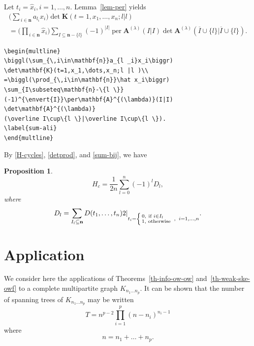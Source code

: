\documentclass{article}
\newtheorem{prop}[thm]{Proposition}
\theoremstyle{definition}
\theoremstyle{remark}
\DeclareMathOperator{\per}{per}
\newcommand{\eval}[2][\right]{\relax
  \ifx#1\right\relax \left.\fi#2#1\rvert}
\newcommand{\envert}[1]{\left\lvert#1\right\rvert}
\begin{document}
Let $t_i=\hat x_i,i=1,\dots,n$. Lemma~\ref{lem-per} yields
\begin{multline}
\biggl(\sum_{\,i\in\mathbf{n}}a_{l _i}x_i\biggr)
\det\mathbf{K}(t=1,x_1,\dots,x_n;l |l )\\
=\biggl(\prod_{\,i\in\mathbf{n}}\hat x_i\biggr)
\sum_{I\subseteq\mathbf{n}-\{l \}}
(-1)^{\envert{I}}\per\mathbf{A}^{(\lambda)}(I|I)
\det\mathbf{A}^{(\lambda)}
(\overline I\cup\{l \}|\overline I\cup\{l \}).
\label{sum-ali}
\end{multline}
\begin{verbatim}
\begin{multline}
\biggl(\sum_{\,i\in\mathbf{n}}a_{l _i}x_i\biggr)
\det\mathbf{K}(t=1,x_1,\dots,x_n;l |l )\\
=\biggl(\prod_{\,i\in\mathbf{n}}\hat x_i\biggr)
\sum_{I\subseteq\mathbf{n}-\{l \}}
(-1)^{\envert{I}}\per\mathbf{A}^{(\lambda)}(I|I)
\det\mathbf{A}^{(\lambda)}
(\overline I\cup\{l \}|\overline I\cup\{l \}).
\label{sum-ali}
\end{multline}
\end{verbatim}

By \eqref{H-cycles}, \eqref{detprod}, and \eqref{sum-bij}, we have
\begin{prop}\label{prop:eg}
\begin{equation}
H_c=\frac1{2n}\sum^n_{l =0}(-1)^{l}
D_{l},
\end{equation}
where
\begin{equation}\label{delta-l}
D_{l}=\eval[2]{\sum_{I_{l}\subseteq \mathbf{n}}
D(t_1,\dots,t_n)}_{t_i=
\left\{\begin{smallmatrix}
0,& \text{if }i\in I_{l}\quad\\%
1,& \text{otherwise}\end{smallmatrix}\right.
\;,\;\; i=1,\dots,n}.
\end{equation}
\end{prop}

\section{Application}
\label{lincomp}

We consider here the applications of Theorems~\ref{th-info-ow-ow}
and~\ref{th-weak-ske-owf} to a complete
multipartite graph $K_{n_1\dots n_p}$. It can be shown that the
number of spanning trees of $K_{n_1\dots n_p}$
may be written
\begin{equation}\label{e:st}
T=n^{p-2}\prod^p_{i=1}
(n-n_i)^{n_i-1}
\end{equation}
where
\begin{equation}
n=n_1+\dots+n_p.
\end{equation}
\end{document}
